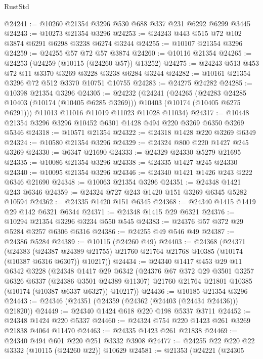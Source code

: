 \begin{lexlean}{RustStd}
\begin{coremodule}
@24241 := @10260 @21354 @3296 @530 @688 @337 @231 @6292 @6299 @3445
@24243 := @10273 @21354 @3296
@24253 := @24243 @443 @515 @72 @102 @3874 @6291 @6298 @3238 @6274 @3244
@24255 := @10107 @21354 @3296
@24259 := @24255 @57 @72 @57 @3874
@24260 := @10116 @21354
@24265 := @24253 (@24259 (@10115 (@24260 @57)) @13252)
@24275 := @24243 @513 @453 @72 @11 @3370 @3269 @3228 @3238 @6284 @3244
@24282 := @10161 @21354 @3296 @72 @512 @3370 @10751 @10755
@24283 := @24275 @24282
@24285 := @10398 @21354 @3296
@24305 := @24232
    (@24241
      (@24265
        (@24283 @24285 @10403 (@10174 (@10405 @6285 @3269)))
        @10403
        (@10174 (@10405 @6275 @6291)))
      @11013
      @11016
      @11019
      @11023
      @11028
      @11034)
@24317 := @10448 @21354 @3296 @3296 @10452 @6301 @1428 @494 @220 @3269 @6350 @3269 @5346
@24318 := @10571 @21354
@24322 := @24318 @1428 @220 @3269 @6349
@24324 := @10580 @21354 @3296
@24329 := @24324 @800 @220 @1427 @245 @3269
@24330 := @6347 @21690
@24333 := @24329 @24330 @5279 @21695
@24335 := @10086 @21354 @3296
@24338 := @24335 @1427 @245 @24330
@24340 := @10095 @21354 @3296
@24346 := @24340 @1421 @1426 @243 @222 @6346 @21690
@24348 := @10063 @21354 @3296
@24351 := @24348 @1421 @243 @6346
@24359 := @24324 @727 @243 @1420 @151 @3269 @6345 @5282 @10594
@24362 := @24335 @1420 @151 @6345
@24368 := @24340 @1415 @1419 @29 @142 @6321 @6344
@24371 := @24348 @1415 @29 @6321
@24376 := @10294 @21354 @3296 @3234 @550 @545
@24383 := @24376 @57 @372 @29 @5284 @3257 @6306 @6316
@24386 := @24255 @49 @546 @49
@24387 := @24386 @5284
@24389 := @10115 (@24260 @49)
@24403 := @24368
    (@24371
      (@24383
        (@24387 @24389 @21755)
        @21760
        @21764
        @21768
        @10385
        (@10174 (@10387 @6316 @6307))
        @10217))
@24434 := @24340
    @1417
    @453
    @29
    @11
    @6342
    @3228
    (@24348
      @1417
      @29
      @6342
      (@24376
        @67
        @372
        @29
        @3501
        @3257
        @6326
        @6337
        (@24386 @3501 @24389 @11307)
        @21760
        @21764
        @21801
        @10385
        (@10174 (@10387 @6337 @6327))
        @10217))
@24436 := @10185 @21354 @3296
@24443 := @24346 (@24351 (@24359 (@24362 (@24403 (@24434 @24436))) @21820))
@24449 := @24340 @1424 @618 @220 @198 @5337 @3711
@24452 := @24348 @1424 @220 @5337
@24460 := @24324 @754 @220 @1423 @261 @3269 @21838 @4064 @11470
@24463 := @24335 @1423 @261 @21838
@24469 := @24340 @494 @601 @220 @251 @3332 @3908
@24477 := @24255 @22 @220 @22 @3332 (@10115 (@24260 @22)) @10629
@24581 := @21353
    (@24221
      (@24305

\end{coremodule}
\end{lexlean}
